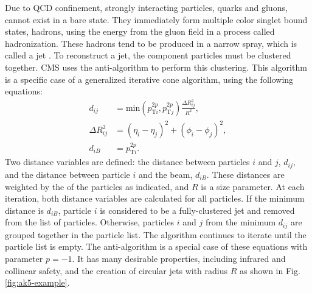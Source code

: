 Due to QCD confinement, strongly interacting particles, quarks and gluons, cannot exist in a bare state. They immediately form multiple color singlet bound states, hadrons, using the energy from the gluon field in a process called hadronization. These hadrons tend to be produced in a narrow spray, which is called a jet \cite{Salam:2009jx}. To reconstruct a jet, the component particles must be clustered together. CMS uses the anti-\kt algorithm \cite{Cacciari:2008gp} to perform this clustering. This algorithm is a specific case of a generalized iterative cone algorithm, using the following equations:
\begin{align}
d_{ij} &= \text{min}(p_{\text{T}i}^{2p},p_{\text{T}j}^{2p})\frac{\Delta R_{ij}^{2}}{R^{2}}, \\
\Delta R_{ij}^{2} &= (\eta_i - \eta_j)^2 + (\phi_i - \phi_j)^{2}, \\
d_{iB} &= p_{\text{T}i}^{2p}.
\end{align}
Two distance variables are defined: the distance between particles $i$ and $j$, $d_{ij}$, and the distance between particle $i$ and the beam, $d_{iB}$. These distances are weighted by the \pt of the particles as indicated, and $R$ is a size parameter. At each iteration, both distance variables are calculated for all particles. If the minimum distance is $d_{iB}$, particle $i$ is considered to be a fully-clustered jet and removed from the list of particles. Otherwise, particles $i$ and $j$ from the minimum $d_{ij}$ are grouped together in the particle list. The algorithm continues to iterate until the particle list is empty. The anti-\kt algorithm is a special case of these equations with parameter $p=-1$. It has many desirable properties, including infrared and collinear safety, and the creation of circular jets with radius $R$ as shown in Fig. \ref{fig:ak5-example}.

